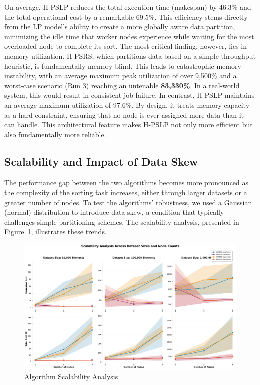 \documentclass{article}
\begin{document}
On average, H-PSLP reduces the total execution time (makespan) by 46.3\% and the total operational cost by a remarkable 69.5\%. This efficiency stems directly from the LP model's ability to create a more globally aware data partition, minimizing the idle time that worker nodes experience while waiting for the most overloaded node to complete its sort. The most critical finding, however, lies in memory utilization. H-PSRS, which partitions data based on a simple throughput heuristic, is fundamentally memory-blind. This leads to catastrophic memory instability, with an average maximum peak utilization of over 9,500\% and a worst-case scenario (Run 3) reaching an untenable \textbf{83,330\%}. In a real-world system, this would result in consistent job failure. In contrast, H-PSLP maintains an average maximum utilization of 97.6\%. By design, it treats memory capacity as a hard constraint, ensuring that no node is ever assigned more data than it can handle. This architectural feature makes H-PSLP not only more efficient but also fundamentally more reliable.

\subsection{Scalability and Impact of Data Skew}

The performance gap between the two algorithms becomes more pronounced as the complexity of the sorting task increases, either through larger datasets or a greater number of nodes. To test the algorithms' robustness, we used a Gaussian (normal) distribution to introduce data skew, a condition that typically challenges simple partitioning schemes. The scalability analysis, presented in Figure~\ref{fig:scalability}, illustrates these trends.

\begin{figure}[h!]
    \centering
    \includegraphics[width=1\linewidth]{images/scalability_analysis.png}
    \caption{Algorithm Scalability Analysis}
    \label{fig:scalability}
\end{figure}
\end{document}
